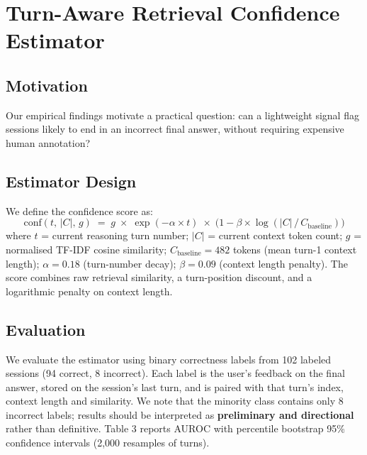 \documentclass[11pt,a4paper]{article}
\begin{document}
\section{Turn-Aware Retrieval Confidence Estimator}

\subsection{Motivation}
Our empirical findings motivate a practical question: can a lightweight signal flag sessions likely to end in an
incorrect final answer, without requiring expensive human annotation?

\subsection{Estimator Design}
We define the confidence score as:
\[
  \mathrm{conf}(t,\,|C|,\,g) \;=\; g \;\times\; \exp(-\alpha \times t)
    \;\times\; \bigl(1 - \beta \times \log(|C|\,/\,C_{\mathrm{baseline}})\bigr)
\]
where $t$ = current reasoning turn number; $|C|$ = current context token count; $g$ = normalised TF-IDF cosine
similarity; $C_{\mathrm{baseline}} = 482$ tokens (mean turn-1 context length); $\alpha = 0.18$ (turn-number decay);
$\beta = 0.09$ (context length penalty). The score combines raw retrieval similarity, a turn-position discount, and a
logarithmic penalty on context length.

\subsection{Evaluation}
We evaluate the estimator using binary correctness labels from 102 labeled sessions (94 correct, 8 incorrect).
Each label is the user's feedback on the final answer, stored on the session's last turn, and is paired with that
turn's index, context length and similarity. We note that the minority class contains only 8 incorrect labels;
results should be interpreted as \textbf{preliminary and directional} rather than definitive. Table 3 reports
AUROC with percentile bootstrap 95\% confidence intervals (2,000 resamples of turns).
\end{document}
